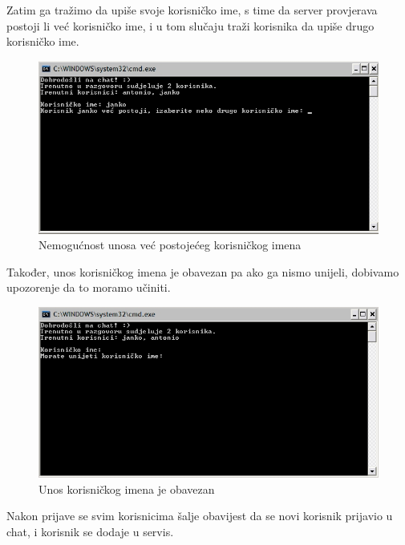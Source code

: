 \documentclass[10pt,a4paper,onecolumn,titlepage]{article}
\begin{document}
Zatim ga tražimo da upiše svoje korisničko ime, s time da server provjerava postoji li
već korisničko ime, i u tom slučaju traži korisnika da upiše drugo korisničko ime.

\begin{figure}[!ht]
\begin{minipage}{\textwidth}
\centering
\includegraphics[width=\textwidth]{images/invalid_username.jpg}
\caption{Nemogućnost unosa već postojećeg korisničkog imena}
\end{minipage}
\end{figure}

Također, unos korisničkog imena je obavezan pa ako ga nismo unijeli, dobivamo upozorenje da to moramo učiniti.

\begin{figure}[!ht]
\begin{minipage}{\textwidth}
\centering
\includegraphics[width=\textwidth]{images/username_required.jpg}
\caption{Unos korisničkog imena je obavezan}
\end{minipage}
\end{figure}

Nakon prijave se svim korisnicima šalje obavijest da se novi korisnik prijavio
u chat, i korisnik se dodaje u servis.
\end{document}
